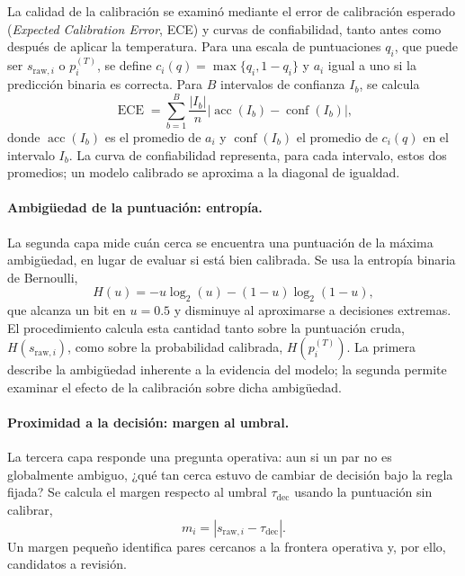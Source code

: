La calidad de la calibración se examinó mediante el error de calibración esperado (\textit{Expected Calibration Error}, ECE) y curvas de confiabilidad, tanto antes como después de aplicar la temperatura. Para una escala de puntuaciones $q_i$, que puede ser $s_{\mathrm{raw},i}$ o $p_i^{(T)}$, se define $c_i(q)=\max\{q_i,1-q_i\}$ y $a_i$ igual a uno si la predicción binaria es correcta. Para $B$ intervalos de confianza $I_b$, se calcula
\begin{equation}
    \operatorname{ECE} = \sum_{b=1}^{B}\frac{|I_b|}{n}\left|\operatorname{acc}(I_b)-\operatorname{conf}(I_b)\right|,
    \label{eq:ece}
\end{equation}
donde $\operatorname{acc}(I_b)$ es el promedio de $a_i$ y $\operatorname{conf}(I_b)$ el promedio de $c_i(q)$ en el intervalo $I_b$. La curva de confiabilidad representa, para cada intervalo, estos dos promedios; un modelo calibrado se aproxima a la diagonal de igualdad.

\paragraph{Ambigüedad de la puntuación: entropía.}
La segunda capa mide cuán cerca se encuentra una puntuación de la máxima ambigüedad, en lugar de evaluar si está bien calibrada. Se usa la entropía binaria de Bernoulli,
\begin{equation}
    H(u)=-u\log_2(u)-(1-u)\log_2(1-u),
    \label{eq:binary_entropy}
\end{equation}
que alcanza un bit en $u=0.5$ y disminuye al aproximarse a decisiones extremas. El procedimiento calcula esta cantidad tanto sobre la puntuación cruda, $H(s_{\mathrm{raw},i})$, como sobre la probabilidad calibrada, $H(p_i^{(T)})$. La primera describe la ambigüedad inherente a la evidencia del modelo; la segunda permite examinar el efecto de la calibración sobre dicha ambigüedad.

\paragraph{Proximidad a la decisión: margen al umbral.}
La tercera capa responde una pregunta operativa: aun si un par no es globalmente ambiguo, ¿qué tan cerca estuvo de cambiar de decisión bajo la regla fijada? Se calcula el margen respecto al umbral $\tau_{\mathrm{dec}}$ usando la puntuación sin calibrar,
\begin{equation}
    m_i=\left|s_{\mathrm{raw},i}-\tau_{\mathrm{dec}}\right|.
    \label{eq:decision_margin}
\end{equation}
Un margen pequeño identifica pares cercanos a la frontera operativa y, por ello, candidatos a revisión.

